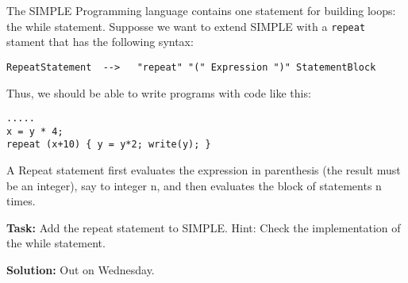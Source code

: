 \documentclass{article}
\begin{document}
The SIMPLE Programming language contains one statement for  building loops: the while statement. Supposse we want to extend SIMPLE with a {\tt repeat} stament that has the following syntax:

\begin{verbatim}
RepeatStatement  -->   "repeat" "(" Expression ")" StatementBlock
\end{verbatim}

Thus, we should be able to write programs with code like this:

\begin{verbatim}
.....
x = y * 4;
repeat (x+10) { y = y*2; write(y); }
\end{verbatim}

A Repeat statement first evaluates the expression in parenthesis (the result must be an integer), say to integer n,  and then evaluates the block of statements n times.

\textbf{Task:} Add the repeat statement to SIMPLE. Hint: Check the implementation of the while statement.

\textbf{Solution:} Out on Wednesday.
\end{document}
